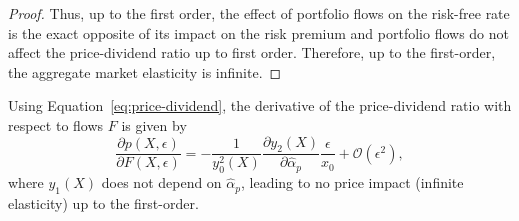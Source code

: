 \begin{proof}
%	
%	
	Thus, up to the first order, the effect of portfolio flows on the risk-free rate is the exact opposite of its impact on the risk premium and portfolio flows do not affect the price-dividend ratio up to first order. Therefore, up to the first-order, the aggregate market elasticity is infinite. 
\end{proof}

Using Equation~\eqref{eq:price-dividend}, the derivative of the price-dividend ratio with respect to flows $F$ is given by
\begin{equation}
\frac{\partial p(X,\epsilon)}{\partial F(X,\epsilon)} =%
-\frac{1}{y_0^2(X)} \frac{\partial y_2(X)}{\partial \hat{\alpha}_p}\frac{\epsilon}{x_0} + \mathcal{O}(\epsilon^2),
\end{equation}
where $ y_1(X) $ does not depend on $ \hat{\alpha}_p $, leading to no price impact (infinite elasticity) up to the first-order.

